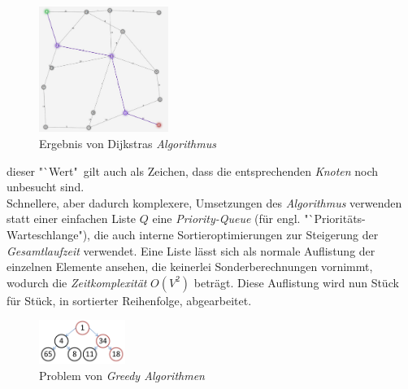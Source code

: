 \documentclass[12pt]{article}
\begin{document}
\begin{figure}
\vspace{-20pt}
\begin{center}
\includegraphics[width=0.375\textwidth]{res/dijk.png}
\end{center}
\vspace{-30pt}
\centering
\caption{Ergebnis von Dijkstras \textit{Algorithmus}}
\label{fig:dijk}
\end{figure}

\noindent dieser "`Wert"\ gilt auch als Zeichen, dass die entsprechenden \textit{Knoten} noch unbesucht sind.
\\
Schnellere, aber dadurch komplexere, Umsetzungen des \textit{Algorithmus} verwenden statt einer einfachen Liste $Q$ eine \textit{Priority-Queue} (für engl. "`Prioritäts-Warteschlange"), die auch interne Sortieroptimierungen zur Steigerung der \textit{Gesamtlaufzeit} verwendet. Eine Liste lässt sich als normale Auflistung der einzelnen Elemente ansehen, die keinerlei Sonderberechnungen vornimmt, wodurch die \textit{Zeitkomplexität} $O(V^2)$ beträgt. Diese Auflistung wird nun Stück für Stück, in sortierter Reihenfolge, abgearbeitet. 
\begin{figure}
\vspace{-20pt}
\begin{center}
\includegraphics[width=0.25\textwidth]{res/greed.png}
\end{center}
\vspace{-30pt}
\centering
\caption{Problem von \textit{Greedy Algorithmen}}
\label{fig:greed}
\end{figure}
\end{document}

